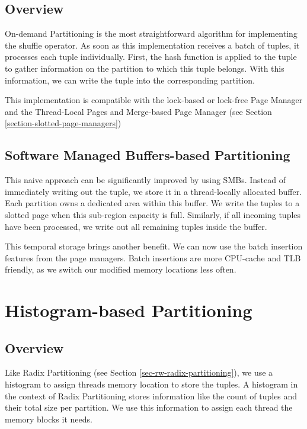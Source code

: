\subsection{Overview}
On-demand Partitioning is the most straightforward algorithm for implementing the shuffle operator.
As soon as this implementation receives a batch of tuples, it processes each tuple individually.
First, the hash function is applied to the tuple to gather information on the partition to which this tuple belongs.
With this information, we can write the tuple into the corresponding partition.

This implementation is compatible with the lock-based or lock-free Page Manager and the Thread-Local Pages and Merge-based Page Manager (see Section \ref{section-slotted-page-managers})

\subsection{Software Managed Buffers-based Partitioning}

This naive approach can be significantly improved by using \acfp{SMB}.
Instead of immediately writing out the tuple, we store it in a thread-locally allocated buffer.
Each partition owns a dedicated area within this buffer.
We write the tuples to a slotted page when this sub-region capacity is full.
Similarly, if all incoming tuples have been processed, we write out all remaining tuples inside the buffer.

This temporal storage brings another benefit.
We can now use the batch insertion features from the page managers.
Batch insertions are more \ac{CPU}-cache and \ac{TLB} friendly, as we switch our modified memory locations less often.

\section{Histogram-based Partitioning}\label{section-histogram-based-partitioning}
\subsection{Overview}
Like Radix Partitioning (see Section \ref{sec-rw-radix-partitioning}), we use a histogram to assign threads memory location to store the tuples.
A histogram in the context of Radix Partitioning stores information like the count of tuples and their total size per partition.
We use this information to assign each thread the memory blocks it needs.

